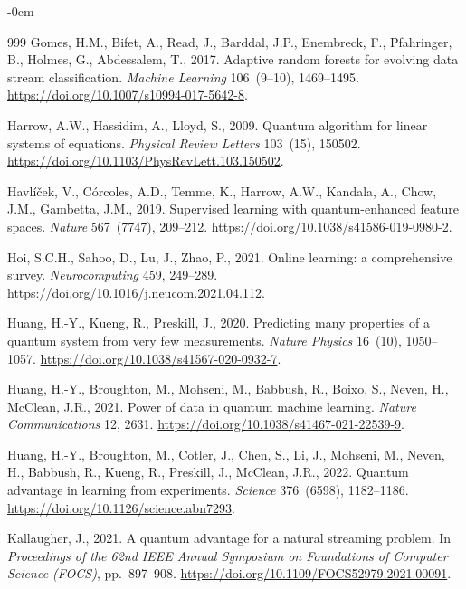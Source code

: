 \documentclass[sensors,article,submit,pdftex,moreauthors]{Definitions/mdpi}
\begin{document}
\begin{adjustwidth}{-\extralength}{0cm}
\begin{thebibliography}{999}
Gomes, H.M., Bifet, A., Read, J., Barddal, J.P., Enembreck, F., Pfahringer, B., Holmes, G., Abdessalem, T., 2017.
\newblock Adaptive random forests for evolving data stream classification.
\newblock \emph{Machine Learning} 106~(9--10), 1469--1495.
\newblock \url{https://doi.org/10.1007/s10994-017-5642-8}.

Harrow, A.W., Hassidim, A., Lloyd, S., 2009.
\newblock Quantum algorithm for linear systems of equations.
\newblock \emph{Physical Review Letters} 103~(15), 150502.
\newblock \url{https://doi.org/10.1103/PhysRevLett.103.150502}.

Havl\'i\v{c}ek, V., C\'orcoles, A.D., Temme, K., Harrow, A.W., Kandala, A., Chow, J.M., Gambetta, J.M., 2019.
\newblock Supervised learning with quantum-enhanced feature spaces.
\newblock \emph{Nature} 567~(7747), 209--212.
\newblock \url{https://doi.org/10.1038/s41586-019-0980-2}.

Hoi, S.C.H., Sahoo, D., Lu, J., Zhao, P., 2021.
\newblock Online learning: a comprehensive survey.
\newblock \emph{Neurocomputing} 459, 249--289.
\newblock \url{https://doi.org/10.1016/j.neucom.2021.04.112}.

Huang, H.-Y., Kueng, R., Preskill, J., 2020.
\newblock Predicting many properties of a quantum system from very few measurements.
\newblock \emph{Nature Physics} 16~(10), 1050--1057.
\newblock \url{https://doi.org/10.1038/s41567-020-0932-7}.

Huang, H.-Y., Broughton, M., Mohseni, M., Babbush, R., Boixo, S., Neven, H., McClean, J.R., 2021.
\newblock Power of data in quantum machine learning.
\newblock \emph{Nature Communications} 12, 2631.
\newblock \url{https://doi.org/10.1038/s41467-021-22539-9}.

Huang, H.-Y., Broughton, M., Cotler, J., Chen, S., Li, J., Mohseni, M., Neven, H., Babbush, R., Kueng, R., Preskill, J., McClean, J.R., 2022.
\newblock Quantum advantage in learning from experiments.
\newblock \emph{Science} 376~(6598), 1182--1186.
\newblock \url{https://doi.org/10.1126/science.abn7293}.

Kallaugher, J., 2021.
\newblock A quantum advantage for a natural streaming problem.
\newblock In \emph{Proceedings of the 62nd IEEE Annual Symposium on Foundations of Computer Science (FOCS)}, pp.~897--908.
\newblock \url{https://doi.org/10.1109/FOCS52979.2021.00091}.


\end{thebibliography}
\end{adjustwidth}
\end{document}
